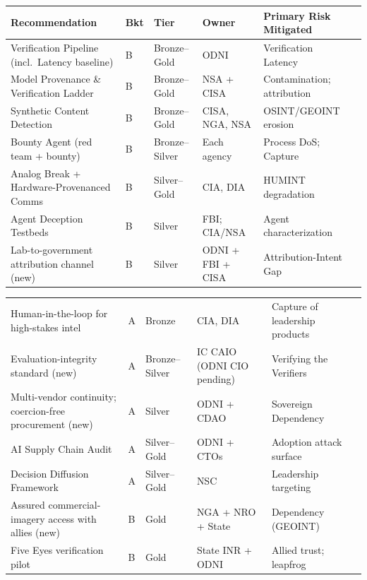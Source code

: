 \documentclass[11pt,letterpaper]{article}
\begin{document}
\begin{center}
\scriptsize
\begin{tabularx}{\linewidth}{ZY{1.77}Y{0.24}Y{0.63}Y{1.06}Y{1.3}}
\toprule
\textbf{Recommendation} & \textbf{Bkt} & \textbf{Tier} & \textbf{Owner} & \textbf{Primary Risk Mitigated} \\
\midrule
Verification Pipeline (incl.\ Latency baseline) & B & Bronze--Gold & ODNI & Verification Latency \\
Model Provenance \& Verification Ladder & B & Bronze--Gold & NSA + CISA & Contamination; attribution \\
Synthetic Content Detection & B & Bronze--Gold & CISA, NGA, NSA & OSINT/GEOINT erosion \\
Bounty Agent (red team + bounty) & B & Bronze--Silver & Each agency & Process DoS; Capture \\
Analog Break + Hardware-Provenanced Comms & B & Silver--Gold & CIA, DIA & HUMINT degradation \\
Agent Deception Testbeds & B & Silver & FBI; CIA/NSA & Agent characterization \\
Lab-to-government attribution channel (new) & B & Silver & ODNI + FBI + CISA & Attribution-Intent Gap \\
\end{tabularx}
\end{center}
\begin{center}
\scriptsize
\begin{tabularx}{\linewidth}{ZY{1.77}Y{0.24}Y{0.63}Y{1.06}Y{1.3}}
Human-in-the-loop for high-stakes intel & A & Bronze & CIA, DIA & Capture of leadership products \\
Evaluation-integrity standard (new) & A & Bronze--Silver & IC CAIO (ODNI CIO pending) & Verifying the Verifiers \\
Multi-vendor continuity; coercion-free procurement (new) & A & Silver & ODNI + CDAO & Sovereign Dependency \\
AI Supply Chain Audit & A & Silver--Gold & ODNI + CTOs & Adoption attack surface \\
Decision Diffusion Framework & A & Silver--Gold & NSC & Leadership targeting \\
Assured commercial-imagery access with allies (new) & B & Gold & NGA + NRO + State & Dependency (GEOINT) \\
Five Eyes verification pilot & B & Gold & State INR + ODNI & Allied trust; leapfrog \\
\bottomrule
\end{tabularx}
\end{center}
\end{document}
